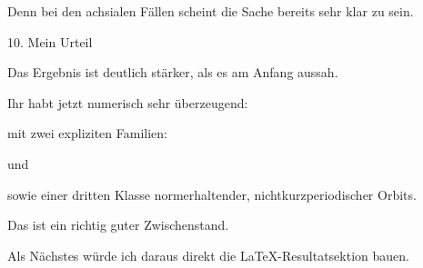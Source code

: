 \documentclass[11pt,a4paper]{article}
\theoremstyle{definition}
\begin{document}
Denn bei den achsialen Fällen scheint die Sache bereits sehr klar zu sein.

10. Mein Urteil

Das Ergebnis ist deutlich stärker, als es am Anfang aussah.

Ihr habt jetzt numerisch sehr überzeugend:


mit zwei expliziten Familien:


und


sowie einer dritten Klasse normerhaltender, nichtkurzperiodischer Orbits.

Das ist ein richtig guter Zwischenstand.

Als Nächstes würde ich daraus direkt die LaTeX-Resultatsektion bauen.
\end{document}
